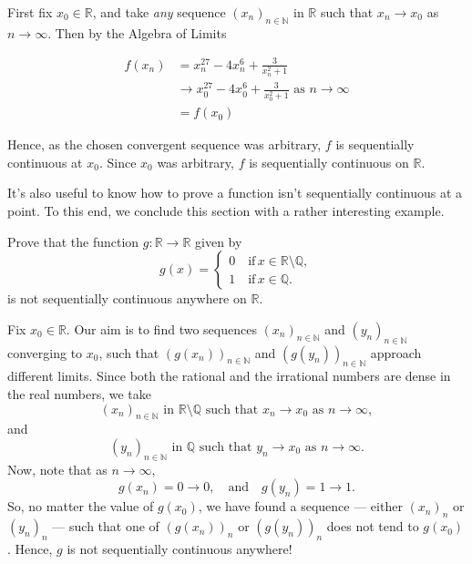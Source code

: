 \documentclass[
  12pt,
  a4paper]{extarticle}
\theoremstyle{plain}
\theoremstyle{plain}
\theoremstyle{plain}
\theoremstyle{plain}
\theoremstyle{plain}
\theoremstyle{definition}
\theoremstyle{definition}
\theoremstyle{definition}
\theoremstyle{remark}
\let\BeginKnitrBlock\begin \let\EndKnitrBlock\end
\renewcommand{\;}{\,}
\begin{document}
\BeginKnitrBlock{solution*}
First fix \(x_0 \in \mathbb{R}\), and take \emph{any} sequence \((x_n)_{n\in\mathbb{N}}\) in \(\mathbb{R}\) such that \(x_n \to x_0\) as \(n \to \infty\). Then by the Algebra of Limits

\begin{align*}
f(x_n) &= x_n^{27} - 4x_n^{6} + \frac{3}{x_n^2 +1}\\
&\to x_0^{27} - 4x_0^6 + \frac{3}{x_0^2 + 1}\; \; \text{as $n \to \infty$}\\
& = f(x_0) 
\end{align*}

Hence, as the chosen convergent sequence was arbitrary, \(f\) is sequentially continuous at \(x_0\). Since \(x_0\) was arbitrary, \(f\) is sequentially continuous on \(\mathbb{R}\).
\EndKnitrBlock{solution*}

It's also useful to know how to prove a function isn't sequentially continuous at a point. To this end, we conclude this section with a rather interesting example.
\BeginKnitrBlock{example}
{\label{exm:ex2} }Prove that the function \(g: \mathbb{R} \to \mathbb{R}\) given by \[g(x) = \begin{cases}
0 \quad \text{if} \; x \in \mathbb{R}\setminus\mathbb{Q},\\
1 \quad \text{if} \; x \in \mathbb{Q}.
\end{cases}\] is not sequentially continuous anywhere on \(\mathbb{R}\).
\EndKnitrBlock{example}

\BeginKnitrBlock{solution*}
Fix \(x_0 \in \mathbb{R}\). Our aim is to find two sequences \((x_n)_{n\in\mathbb{N}}\) and \((y_n)_{n\in\mathbb{N}}\) converging to \(x_0\), such that \(\left(g(x_n)\right)_{n\in\mathbb{N}}\) and \(\left(g(y_n)\right)_{n\in\mathbb{N}}\) approach different limits. Since both the rational and the irrational numbers are dense in the real numbers, we take \[(x_n)_{n\in\mathbb{N}}\;\; \text{in}\;\; \mathbb{R}\setminus\mathbb{Q} \;\; \text{such that} \;\; x_n \to x_0 \;\; \text{as}\;\; n \to \infty,\] and \[(y_n)_{n\in\mathbb{N}}\;\; \text{in}\;\; \mathbb{Q} \;\; \text{such that} \;\; y_n \to x_0 \;\; \text{as}\;\; n \to \infty.\] Now, note that as \(n \to \infty,\) \[g(x_n) = 0 \to 0, \quad \text{and} \quad g(y_n) = 1 \to 1.\] So, no matter the value of \(g(x_0)\), we have found a sequence --- either \((x_n)_n\) or \((y_n)_n\) --- such that one of \(\left(g(x_n)\right)_n\) or \(\left(g(y_n)\right)_n\) does not tend to \(g(x_0)\). Hence, \(g\) is not sequentially continuous anywhere!
\EndKnitrBlock{solution*}
\end{document}
